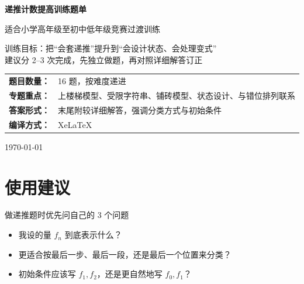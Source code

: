 \documentclass[11pt,a4paper,fontset=fandol]{ctexart}
\theoremstyle{formalexample}
\begin{document}
\thispagestyle{empty}
\begin{titlepage}
\centering
\vspace*{0.9cm}
\begin{tcolorbox}[
  enhanced,
  width=0.92\textwidth,
  colback=white,
  colframe=mainblue,
  boxrule=1pt,
  arc=0mm,
  left=6mm,
  right=6mm,
  top=8mm,
  bottom=8mm
]
\centering
{\fontsize{24}{30}\selectfont\bfseries 递推计数提高训练题单\par}
\vspace{0.6cm}
{\fontsize{17}{22}\selectfont 适合小学高年级至初中低年级竞赛过渡训练\par}

\vspace{1cm}
\begin{tcolorbox}[colback=lightblue,colframe=mainblue,width=0.84\textwidth,boxrule=1pt]
\centering
{\large 训练目标：把“会套递推”提升到“会设计状态、会处理变式”}\\[0.35em]
{\normalsize 建议分 2--3 次完成，先独立做题，再对照详细解答订正}
\end{tcolorbox}

\vspace{1cm}
\renewcommand{\arraystretch}{1.42}
\begin{tabular}{>{\bfseries}p{3.5cm}p{8cm}}
题目数量： & 16 题，按难度递进 \\
专题重点： & 上楼梯模型、受限字符串、铺砖模型、状态设计、与错位排列联系 \\
答案形式： & 末尾附较详细解答，强调分类方式与初始条件 \\
编译方式： & XeLaTeX \\
\end{tabular}

\vspace{0.9cm}
{\large \today\par}
\end{tcolorbox}
\end{titlepage}

\tableofcontents
\newpage

\section{使用建议}

\begin{goalbox}{做递推题时优先问自己的 3 个问题}
\begin{itemize}
  \item 我设的量 $f_n$ 到底表示什么？
  \item 更适合按最后一步、最后一段，还是最后一个位置来分类？
  \item 初始条件应该写 $f_1,f_2$，还是更自然地写 $f_0,f_1$？
\end{itemize}
\end{goalbox}
\end{document}
